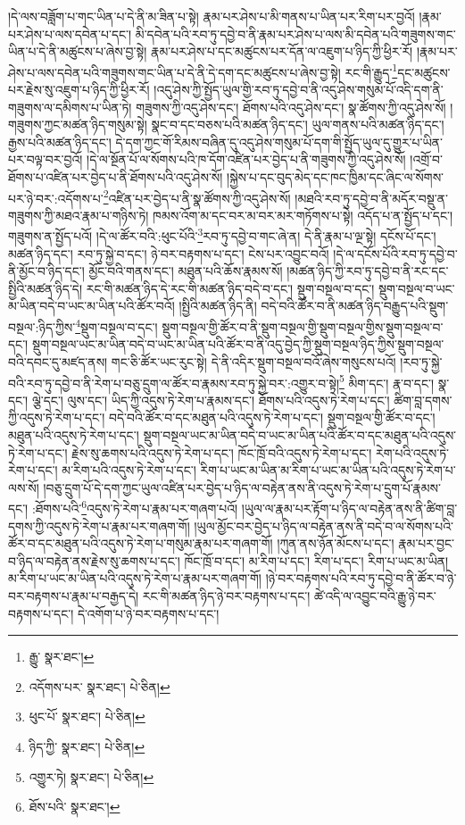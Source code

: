 །དེ་ལས་བཟློག་པ་གང་ཡིན་པ་དེ་ནི་མ་ཟིན་པ་སྟེ། རྣམ་པར་ཤེས་པ་མི་གནས་པ་ཡིན་པར་རིག་པར་བྱའོ། །རྣམ་པར་ཤེས་པ་ལས་དབེན་པ་དང་། མི་དབེན་པའི་རབ་ཏུ་དབྱེ་བ་ནི་རྣམ་པར་ཤེས་པ་ལས་མི་དབེན་པའི་གཟུགས་གང་ཡིན་པ་དེ་ནི་མཚུངས་པ་ཞེས་བྱ་སྟེ། རྣམ་པར་ཤེས་པ་དང་མཚུངས་པར་དོན་ལ་འཇུག་པ་ཉིད་ཀྱི་ཕྱིར་རོ། །རྣམ་པར་ཤེས་པ་ལས་དབེན་པའི་གཟུགས་གང་ཡིན་པ་དེ་ནི་དེ་དག་དང་མཚུངས་པ་ཞེས་བྱ་སྟེ། རང་གི་རྒྱུད་\footnote{རྒྱུ་  སྣར་ཐང་། }དང་མཚུངས་པར་རྗེས་སུ་འཇུག་པ་ཉིད་ཀྱི་ཕྱིར་རོ། །འདུ་ཤེས་ཀྱི་སྤྱོད་ཡུལ་གྱི་རབ་ཏུ་དབྱེ་བ་ནི་འདུ་ཤེས་གསུམ་པོ་འདི་དག་ནི་གཟུགས་ལ་དམིགས་པ་ཡིན་ཏེ། གཟུགས་ཀྱི་འདུ་ཤེས་དང་། ཐོགས་པའི་འདུ་ཤེས་དང་། སྣ་ཚོགས་ཀྱི་འདུ་ཤེས་སོ། །གཟུགས་ཀྱང་མཚན་ཉིད་གསུམ་སྟེ། སྣང་བ་དང་བཅས་པའི་མཚན་ཉིད་དང་། ཡུལ་གནས་པའི་མཚན་ཉིད་དང་། རྒྱས་པའི་མཚན་ཉིད་དང་། དེ་དག་ཀྱང་གོ་རིམས་བཞིན་དུ་འདུ་ཤེས་གསུམ་པོ་དག་གི་སྤྱོད་ཡུལ་དུ་གྱུར་པ་ཡིན་པར་བལྟ་བར་བྱའོ། །དེ་ལ་སྔོན་པོ་ལ་སོགས་པའི་ཁ་དོག་འཛིན་པར་བྱེད་པ་ནི་གཟུགས་ཀྱི་འདུ་ཤེས་སོ། །འགྲོ་བ་ཐོགས་པ་འཛིན་པར་བྱེད་པ་ནི་ཐོགས་པའི་འདུ་ཤེས་སོ། །སྐྱེས་པ་དང་བུད་མེད་དང་ཁང་ཁྱིམ་དང་ཞིང་ལ་སོགས་པར་ཉེ་བར་:འདོགས་པ་\footnote{འདོགས་པར་  སྣར་ཐང་།  པེ་ཅིན། }འཛིན་པར་བྱེད་པ་ནི་སྣ་ཚོགས་ཀྱི་འདུ་ཤེས་སོ། །མཐའི་རབ་ཏུ་དབྱེ་བ་ནི་མདོར་བསྡུ་ན་གཟུགས་ཀྱི་མཐའ་རྣམ་པ་གཉིས་ཏེ། ཁམས་འོག་མ་དང་བར་མ་བར་མར་གཏོགས་པ་སྟེ། འདོད་པ་ན་སྤྱོད་པ་དང་། གཟུགས་ན་སྤྱོད་པའོ། །དེ་ལ་ཚོར་བའི་:ཕུང་པོའི་\footnote{ཕུང་པོ་  སྣར་ཐང་།  པེ་ཅིན། }རབ་ཏུ་དབྱེ་བ་གང་ཞེ་ན། དེ་ནི་རྣམ་པ་ལྔ་སྟེ། དངོས་པོ་དང་། མཚན་ཉིད་དང་། རབ་ཏུ་སྐྱེ་བ་དང་། ཉེ་བར་བརྟགས་པ་དང་། ངེས་པར་འབྱུང་བའོ། །དེ་ལ་དངོས་པོའི་རབ་ཏུ་དབྱེ་བ་ནི་མྱོང་བ་ཉིད་དང་། མྱོང་བའི་གནས་དང་། མཐུན་པའི་ཆོས་རྣམས་སོ། །མཚན་ཉིད་ཀྱི་རབ་ཏུ་དབྱེ་བ་ནི་རང་དང་སྤྱིའི་མཚན་ཉིད་དེ། རང་གི་མཚན་ཉིད་དེ་རང་གི་མཚན་ཉིད་བདེ་བ་དང་། སྡུག་བསྔལ་བ་དང་། སྡུག་བསྔལ་བ་ཡང་མ་ཡིན་བདེ་བ་ཡང་མ་ཡིན་པའི་ཚོར་བའོ། །སྤྱིའི་མཚན་ཉིད་ནི། བདེ་བའི་ཚོར་བ་ནི་མཚན་ཉིད་བརྒྱུད་པའི་སྡུག་བསྔལ་:ཉིད་ཀྱིས་\footnote{ཉིད་ཀྱི་  སྣར་ཐང་།  པེ་ཅིན། }སྡུག་བསྔལ་བ་དང་། སྡུག་བསྔལ་གྱི་ཚོར་བ་ནི་སྡུག་བསྔལ་གྱི་སྡུག་བསྔལ་གྱིས་སྡུག་བསྔལ་བ་དང་། སྡུག་བསྔལ་ཡང་མ་ཡིན་བདེ་བ་ཡང་མ་ཡིན་པའི་ཚོར་བ་ནི་འདུ་བྱེད་ཀྱི་སྡུག་བསྔལ་ཉིད་ཀྱིས་སྡུག་བསྔལ་བའི་དབང་དུ་མཛད་ནས། གང་ཅི་ཚོར་ཡང་རུང་སྟེ། དེ་ནི་འདིར་སྡུག་བསྔལ་བའོ་ཞེས་གསུངས་པའོ། །རབ་ཏུ་སྐྱེ་བའི་རབ་ཏུ་དབྱེ་བ་ནི་རེག་པ་བཅུ་དྲུག་ལ་ཚོར་བ་རྣམས་རབ་ཏུ་སྐྱེ་བར་:འགྱུར་བ་སྟེ།\footnote{འགྱུར་ཏེ།  སྣར་ཐང་།  པེ་ཅིན། } མིག་དང་། རྣ་བ་དང་། སྣ་དང་། ལྕེ་དང་། ལུས་དང་། ཡིད་ཀྱི་འདུས་ཏེ་རེག་པ་རྣམས་དང་། ཐོགས་པའི་འདུས་ཏེ་རེག་པ་དང་། ཚིག་བླ་དགས་ཀྱི་འདུས་ཏེ་རེག་པ་དང་། བདེ་བའི་ཚོར་བ་དང་མཐུན་པའི་འདུས་ཏེ་རེག་པ་དང་། སྡུག་བསྔལ་གྱི་ཚོར་བ་དང་། མཐུན་པའི་འདུས་ཏེ་རེག་པ་དང་། སྡུག་བསྔལ་ཡང་མ་ཡིན་བདེ་བ་ཡང་མ་ཡིན་པའི་ཚོར་བ་དང་མཐུན་པའི་འདུས་ཏེ་རེག་པ་དང་། རྗེས་སུ་ཆགས་པའི་འདུས་ཏེ་རེག་པ་དང་། ཁོང་ཁྲོ་བའི་འདུས་ཏེ་རེག་པ་དང་། རེག་པའི་འདུས་ཏེ་རེག་པ་དང་། མ་རིག་པའི་འདུས་ཏེ་རེག་པ་དང་། རིག་པ་ཡང་མ་ཡིན་མ་རིག་པ་ཡང་མ་ཡིན་པའི་འདུས་ཏེ་རེག་པ་ལས་སོ། །བཅུ་དྲུག་པོ་དེ་དག་ཀྱང་ཡུལ་འཛིན་པར་བྱེད་པ་ཉིད་ལ་བརྟེན་ནས་ནི་འདུས་ཏེ་རེག་པ་དྲུག་པོ་རྣམས་དང་། :ཐོགས་པའི་\footnote{ཐོས་པའི་  སྣར་ཐང་། }འདུས་ཏེ་རེག་པ་རྣམ་པར་གཞག་པའོ། །ཡུལ་ལ་རྣམ་པར་རྟོག་པ་ཉིད་ལ་བརྟེན་ནས་ནི་ཚིག་བླ་དགས་ཀྱི་འདུས་ཏེ་རེག་པ་རྣམ་པར་གཞག་གོ། །ཡུལ་མྱོང་བར་བྱེད་པ་ཉིད་ལ་བརྟེན་ནས་ནི་བདེ་བ་ལ་སོགས་པའི་ཚོར་བ་དང་མཐུན་པའི་འདུས་ཏེ་རེག་པ་གསུམ་རྣམ་པར་གཞག་གོ། །ཀུན་ནས་ཉོན་མོངས་པ་དང་། རྣམ་པར་བྱང་བ་ཉིད་ལ་བརྟེན་ནས་རྗེས་སུ་ཆགས་པ་དང་། ཁོང་ཁྲོ་བ་དང་། མ་རིག་པ་དང་། རིག་པ་དང་། རིག་པ་ཡང་མ་ཡིན། མ་རིག་པ་ཡང་མ་ཡིན་པའི་འདུས་ཏེ་རེག་པ་རྣམ་པར་གཞག་གོ། །ཉེ་བར་བརྟགས་པའི་རབ་ཏུ་དབྱེ་བ་ནི་ཚོར་བ་ཉེ་བར་བརྟགས་པ་རྣམ་པ་བརྒྱད་དེ། རང་གི་མཚན་ཉིད་ཉེ་བར་བརྟགས་པ་དང་། ཚེ་འདི་ལ་འབྱུང་བའི་རྒྱུ་ཉེ་བར་བརྟགས་པ་དང་། དེ་འགོག་པ་ཉེ་བར་བརྟགས་པ་དང་། 